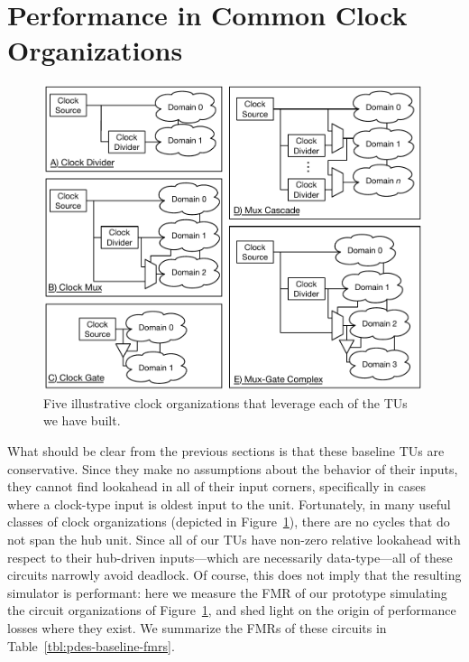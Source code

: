 \section{Performance in Common Clock Organizations}\label{sec:pdes-common-circuit-perf}

\begin{figure}
    \centering
    \includegraphics[width=0.99\textwidth]{figures/clock-organizations.pdf}
    \caption{Five illustrative clock organizations that leverage each of the TUs we have built.}
    \label{fig:clock-organizations}
\end{figure}

What should be clear from the previous sections is that these baseline TUs are
conservative. Since they make no assumptions about the behavior of their
inputs, they cannot find lookahead in all of their input corners, specifically
in cases where a clock-type input is oldest input to the unit. Fortunately, in
many useful classes of clock organizations (depicted in
Figure~\ref{fig:clock-organizations}), there are no cycles that do not span the
hub unit. Since all of our TUs have non-zero relative lookahead with respect to
their hub-driven inputs---which are necessarily data-type---all of these circuits narrowly avoid deadlock.
Of course, this does not imply that the resulting simulator is performant: here we measure
the FMR of our prototype simulating the circuit organizations of
Figure~\ref{fig:clock-organizations}, and shed light on the origin of
performance losses where they exist. We summarize the FMRs of these circuits in
Table~\ref{tbl:pdes-baseline-fmrs}.

